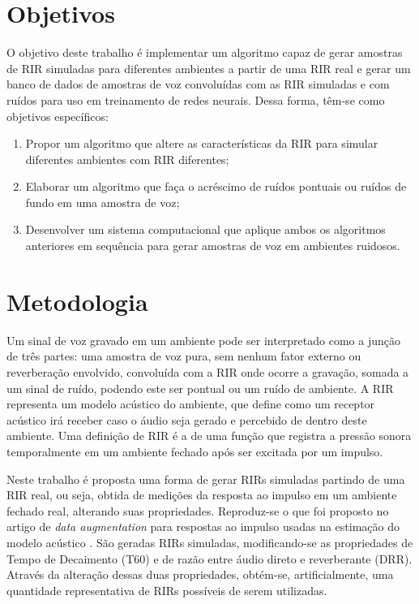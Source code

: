 \section{Objetivos}

O objetivo deste trabalho é implementar um algoritmo capaz de gerar amostras de RIR simuladas para diferentes ambientes a partir de uma RIR real e
gerar um banco de dados de amostras de voz convoluídas com as RIR simuladas e com ruídos para uso em treinamento de redes neurais.
Dessa forma, têm-se como objetivos específicos:

\begin{enumerate}
      \item Propor um algoritmo que altere as características da RIR para simular diferentes ambientes com RIR diferentes;
      \item Elaborar um algoritmo que faça o acréscimo de ruídos pontuais ou ruídos de fundo em uma amostra de voz;
      \item Desenvolver um sistema computacional que aplique ambos os algoritmos anteriores em sequência para gerar
      amostras de voz em ambientes ruidosos.
\end{enumerate}


\section{Metodologia}

Um sinal de voz gravado em um ambiente pode ser interpretado como a junção de três partes: uma amostra de voz pura, sem nenhum fator externo
ou reverberação envolvido, convoluída com a RIR onde ocorre a gravação, somada a um sinal de ruído, podendo este 
ser pontual ou um ruído de ambiente. A RIR representa um modelo acústico do ambiente, que define como um receptor acústico irá receber caso o áudio
seja gerado e percebido de dentro deste ambiente. Uma definição de RIR é a de uma função que registra a pressão sonora temporalmente
em um ambiente fechado após ser excitada por um impulso.

Neste trabalho é proposta uma forma de gerar RIRs simuladas partindo de uma RIR real, ou seja, obtida de medições da resposta ao impulso em um ambiente
fechado real, alterando suas propriedades. Reproduz-se o que foi proposto no artigo de \textit{data augmentation} para respostas ao impulso usadas na
estimação do modelo acústico \cite{RIR_Data_Aug}. São geradas RIRs simuladas, modificando-se as propriedades de Tempo de Decaimento (T60) e de
razão entre áudio direto e reverberante (DRR). Através da alteração dessas duas propriedades,
obtém-se, artificialmente, uma quantidade representativa de RIRs possíveis de serem utilizadas.

